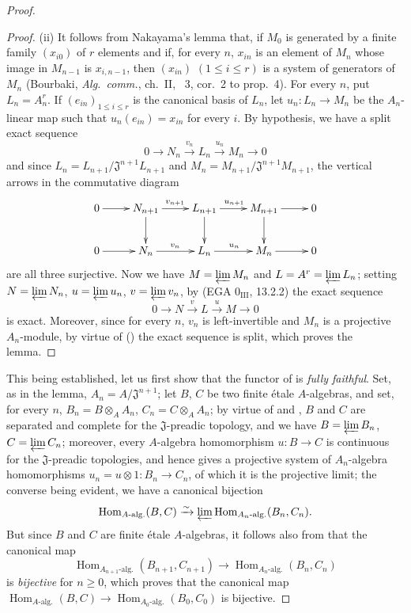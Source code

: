 \begin{proof}
\begin{proof}
(ii) It follows from Nakayama's lemma that, if $M_0$ is generated by a finite family $(x_{i0})$ of $r$ elements and if, for every $n$, $x_{in}$ is an element of $M_n$ whose image in $M_{n-1}$ is $x_{i,n-1}$, then $(x_{in})$ $(1\leq i\leq r)$ is a system of generators of $M_n$ (Bourbaki, \emph{Alg.\ comm.}, ch.~II, \textsection~3, cor.~2 to prop.~4).  For every $n$, put $L_n=A_n^r$.  If $(e_{in})_{1\leq i\leq r}$ is the canonical basis of $L_n$, let $u_n:L_n\to M_n$ be the $A_n$-linear map such that $u_n(e_{in})=x_{in}$ for every $i$.
By hypothesis, we have a split exact sequence
\[
0\to N_n\xrightarrow{v_n} L_n\xrightarrow{u_n} M_n\to 0
\]
and since $L_n=L_{n+1}/\mathfrak{J}^{n+1}L_{n+1}$ and $M_n=M_{n+1}/\mathfrak{J}^{n+1}M_{n+1}$, the vertical arrows in the commutative diagram
\[
\xymatrix{
0\ar[r] & N_{n+1}\ar[r]^{v_{n+1}}\ar[d] & L_{n+1}\ar[r]^{u_{n+1}}\ar[d] & M_{n+1}\ar[r]\ar[d] & 0\\
0\ar[r] & N_n\ar[r]^{v_n} & L_n\ar[r]^{u_n} & M_n\ar[r] & 0
}
\]
are all three surjective.
Now we have $M=\varprojlim M_n$ and $L=A^r=\varprojlim L_n$;
setting $N=\varprojlim N_n$, $u=\varprojlim u_n$, $v=\varprojlim v_n$, by (EGA $0_{\mathrm{III}}$, 13.2.2) the exact sequence
\[
\label{IV.18.3.2.2}
0\to N\xrightarrow{v} L\xrightarrow{u} M\to 0
\tag{18.3.2.2}
\]
is exact.
Moreover, since for every $n$, $v_n$ is left-invertible and $M_n$ is a projective $A_n$-module, by virtue of () the exact sequence  is split, which proves the lemma.
\end{proof}

This being established, let us first show that the functor of  is \emph{fully faithful}.
Set, as in the lemma, $A_n=A/\mathfrak{J}^{n+1}$;
let $B$, $C$ be two finite \'etale $A$-algebras, and set, for every $n$, $B_n=B\otimes_A A_n$, $C_n=C\otimes_A A_n$;
by virtue of  and , $B$ and $C$ are separated and complete for the $\mathfrak{J}$-preadic topology, and we have $B=\varprojlim B_n$, $C=\varprojlim C_n$;
moreover, every $A$-algebra homomorphism $u:B\to C$ is continuous for the $\mathfrak{J}$-preadic topologies, and hence gives a projective system of $A_n$-algebra homomorphisms $u_n=u\otimes 1:B_n\to C_n$, of which it is the projective limit;
the converse being evident, we have a canonical bijection
\[
\operatorname{Hom}_{A\text{-}\mathrm{alg.}}(B,C)\xrightarrow{\sim}\varprojlim\operatorname{Hom}_{A_n\text{-}\mathrm{alg.}}(B_n,C_n).
\]
But since $B$ and $C$ are finite \'etale $A$-algebras, it follows also from  that the canonical map
\[
\operatorname{Hom}_{A_{n+1}\text{-}\mathrm{alg.}}(B_{n+1},C_{n+1})\to\operatorname{Hom}_{A_n\text{-}\mathrm{alg.}}(B_n,C_n)
\]
is \emph{bijective} for $n\geq 0$, which proves that the canonical map $\operatorname{Hom}_{A\text{-}\mathrm{alg.}}(B,C)\to\operatorname{Hom}_{A_0\text{-}\mathrm{alg.}}(B_0,C_0)$ is bijective.


\end{proof}
